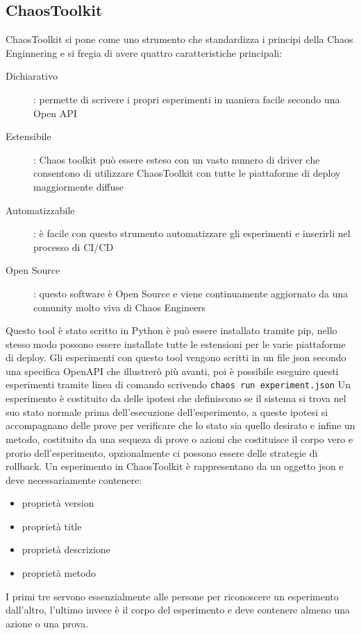 \subsection{ChaosToolkit}
ChaosToolkit si pone come uno strumento che standardizza i principi della Chaos Enginnering e si fregia di avere quattro caratteristiche principali:
\begin{description}
    \item[Dichiarativo]: permette di scrivere i propri esperimenti in maniera facile secondo una Open API
    \item[Estensibile]: Chaos toolkit può essere esteso con un vasto numero di driver che consentono di utilizzare ChaosToolkit con tutte le piattaforme di deploy maggiormente diffuse
    \item[Automatizzabile]: è facile con questo strumento automatizzare gli esperimenti e inserirli nel processo di CI/CD
    \item[Open Source]: questo software è Open Source e viene continuamente aggiornato da una comunity molto viva di Chaos Engineers
\end{description}
Questo tool è stato scritto in Python è può essere installato tramite \gls{pip}, nello stesso modo possono essere installate tutte le estensioni per le varie piattaforme di deploy.
Gli esperimenti con questo tool vengono scritti in un file \gls{json} secondo una specifica OpenAPI che illustrerò più avanti, poi è possibile eseguire questi esperimenti tramite linea di comando scrivendo
\texttt{chaos run experiment.json}
Un esperimento è costituito da delle ipotesi che definiscono se il sistema si trova nel suo stato normale prima dell'esecuzione dell'esperimento, a queste ipotesi si accompagnano delle prove per verificare che lo stato sia quello desirato e infine un metodo, costituito da una sequeza di prove o azioni che costituisce il corpo vero e prorio dell'esperimento, opzionalmente ci possono essere delle strategie di rollback.
Un esperimento in ChaosToolkit è rappresentano da un oggetto json e deve necessariamente contenere:
\begin{itemize}
    \item proprietà version
    \item proprietà title
    \item proprietà descrizione
    \item proprietà metodo
\end{itemize}
I primi tre servono essenzialmente alle persone per riconoscere un esperimento dall'altro, l'ultimo invece è il corpo del esperimento e deve contenere almeno una azione o una prova.
